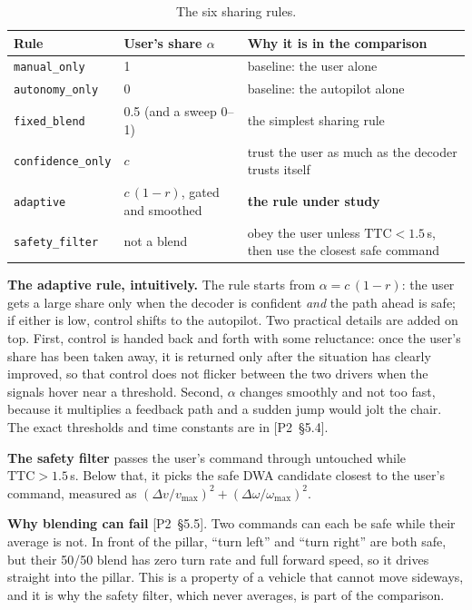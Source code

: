 \documentclass[11pt,a4paper]{article}
\newcommand{\ptwo}[1]{{\small\textsf{[P2~\S#1]}}}
\newcommand{\code}[1]{\texttt{#1}}
\newcommand{\TTC}{\mathrm{TTC}}
\begin{document}
\begin{table}[H]
\centering\small
\begin{tabular}{@{}llp{7.2cm}@{}}
\toprule
Rule & User's share $\alpha$ & Why it is in the comparison \\
\midrule
\code{manual\_only}     & 1                     & baseline: the user alone \\
\code{autonomy\_only}   & 0                     & baseline: the autopilot alone \\
\code{fixed\_blend}     & 0.5 (and a sweep 0--1) & the simplest sharing rule \\
\code{confidence\_only} & $c$                   & trust the user as much as the decoder trusts itself \\
\code{adaptive}         & $c\,(1-r)$, gated and smoothed & \textbf{the rule under study} \\
\code{safety\_filter}   & not a blend           & obey the user unless $\TTC < 1.5$\,s, then use the closest safe command \\
\bottomrule
\end{tabular}
\caption{The six sharing rules.}
\label{tab:rules}
\end{table}

\textbf{The adaptive rule, intuitively.} The rule starts from
$\alpha = c\,(1-r)$: the user gets a large share only when the decoder is
confident \emph{and} the path ahead is safe; if either is low, control
shifts to the autopilot. Two practical details are added on top. First,
control is handed back and forth with some reluctance: once the user's
share has been taken away, it is returned only after the situation has
clearly improved, so that control does not flicker between the two
drivers when the signals hover near a threshold. Second, $\alpha$ changes
smoothly and not too fast, because it multiplies a feedback path and a
sudden jump would jolt the chair. The exact thresholds and time constants
are in \ptwo{5.4}.

\textbf{The safety filter} passes the user's command through untouched
while $\TTC > 1.5$\,s. Below that, it picks the safe DWA candidate closest
to the user's command, measured as
$(\Delta v/v_{\max})^2 + (\Delta\omega/\omega_{\max})^2$.

\textbf{Why blending can fail} \ptwo{5.5}. Two commands can each be safe
while their average is not. In front of the pillar, ``turn left'' and
``turn right'' are both safe, but their 50/50 blend has zero turn rate
and full forward speed, so it drives straight into the pillar. This is a
property of a vehicle that cannot move sideways, and it is why the safety
filter, which never averages, is part of the comparison.
\end{document}
